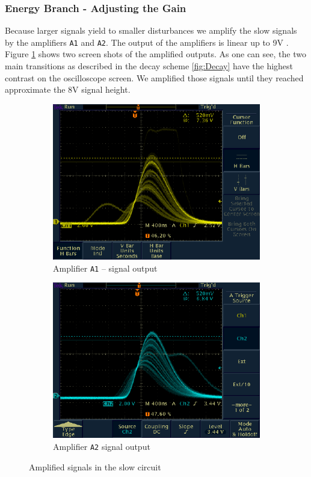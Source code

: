 \documentclass[11pt,a4paper,notitlepage]{scrartcl}
\begin{document}
\subsubsection{Energy Branch - Adjusting the Gain}
Because larger signals yield to smaller disturbances \cite{manual} we amplify the slow signals by the amplifiers \texttt{A1} and \texttt{A2}. The output of the amplifiers is linear up to 9V \cite{manual}. Figure \ref{fig:amp_osci} shows two screen shots of the amplified outputs. As one can see, the two main transitions as described in the decay scheme \ref{fig:Decay} have the highest contrast on the oscilloscope screen. We amplified those signals until they reached approximate the 8V signal height.
\begin{figure}[htbp]
	\begin{subfigure}{0.49\linewidth}
		\includegraphics[width=\linewidth]{figs/osci_pics/Amp1.pdf}
		\caption{Amplifier \texttt{A1} -- signal output}
	\end{subfigure}
		\begin{subfigure}{0.49\linewidth}
		\includegraphics[width=\linewidth]{figs/osci_pics/Amp2.pdf}
		\caption{Amplifier \texttt{A2} signal output}
	\end{subfigure}
	\caption{Amplified signals in the slow circuit}\label{fig:amp_osci}
\end{figure}
\end{document}
